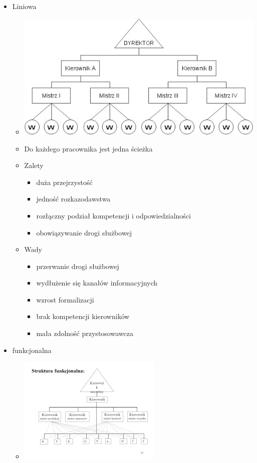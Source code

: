 \documentclass[a4paper,10pt]{report}
\begin{document}
\begin{itemize}
	\item Liniowa
	\begin{itemize}
		\item \includegraphics[scale=2]{assets/str_liniowa}
		\item Do każdego pracownika jest jedna ścieżka
		\item Zalety
		\begin{itemize}
			\item duża przejrzystość
			\item jedność rozkazodawstwa
			\item rozłączny podział kompetencji i odpowiedzialności
			\item obowiązywanie drogi służbowej
		\end{itemize}
		\item Wady
		\begin{itemize}
			\item przerwanie drogi służbowej
			\item wydłużenie się kanałów informacyjnych
			\item wzrost formalizacji
			\item brak kompetencji kierowników
			\item mała zdolność przystosowawcza
		\end{itemize}
	\end{itemize}
	\item funkcjonalna
	\begin{itemize}
		\item \includegraphics[scale=1.2]{assets/str_funkcjonalna}

\end{itemize}
\end{itemize}
\end{document}
